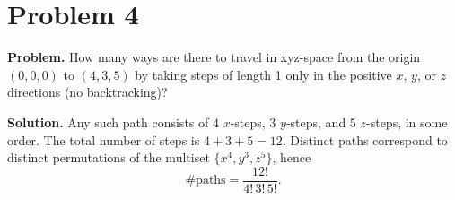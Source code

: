 \section*{Problem 4}
\textbf{Problem.} How many ways are there to travel in xyz-space from the origin \((0,0,0)\) to \((4,3,5)\) by taking steps of length 1 only in the positive \(x\), \(y\), or \(z\) directions (no backtracking)?

\medskip
\textbf{Solution.}
Any such path consists of \(4\) \(x\)-steps, \(3\) \(y\)-steps, and \(5\) \(z\)-steps, in some order. The total number of steps is \(4+3+5=12\). Distinct paths correspond to distinct permutations of the multiset
\(\{x^4,y^3,z^5\}\), hence
\[
\#\text{paths}=\frac{12!}{4!\,3!\,5!}.
\]
